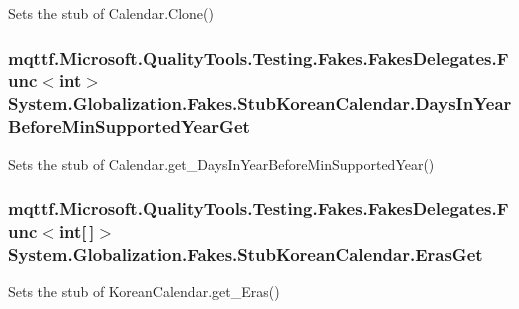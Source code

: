 Sets the stub of Calendar.\-Clone()

\hypertarget{class_system_1_1_globalization_1_1_fakes_1_1_stub_korean_calendar_acfc9b3e9fad5230006306a0656bef514}{
\subsubsection[{Days\-In\-Year\-Before\-Min\-Supported\-Year\-Get}]{\setlength{\rightskip}{0pt plus 5cm}mqttf.\-Microsoft.\-Quality\-Tools.\-Testing.\-Fakes.\-Fakes\-Delegates.\-Func$<$int$>$ System.\-Globalization.\-Fakes.\-Stub\-Korean\-Calendar.\-Days\-In\-Year\-Before\-Min\-Supported\-Year\-Get}}\label{class_system_1_1_globalization_1_1_fakes_1_1_stub_korean_calendar_acfc9b3e9fad5230006306a0656bef514}


Sets the stub of Calendar.\-get\-\_\-\-Days\-In\-Year\-Before\-Min\-Supported\-Year()

\hypertarget{class_system_1_1_globalization_1_1_fakes_1_1_stub_korean_calendar_a1c9eb69dd319eddb88a1e0d383b5ea52}{
\subsubsection[{Eras\-Get}]{\setlength{\rightskip}{0pt plus 5cm}mqttf.\-Microsoft.\-Quality\-Tools.\-Testing.\-Fakes.\-Fakes\-Delegates.\-Func$<$int\mbox{[}$\,$\mbox{]}$>$ System.\-Globalization.\-Fakes.\-Stub\-Korean\-Calendar.\-Eras\-Get}}\label{class_system_1_1_globalization_1_1_fakes_1_1_stub_korean_calendar_a1c9eb69dd319eddb88a1e0d383b5ea52}


Sets the stub of Korean\-Calendar.\-get\-\_\-\-Eras()

